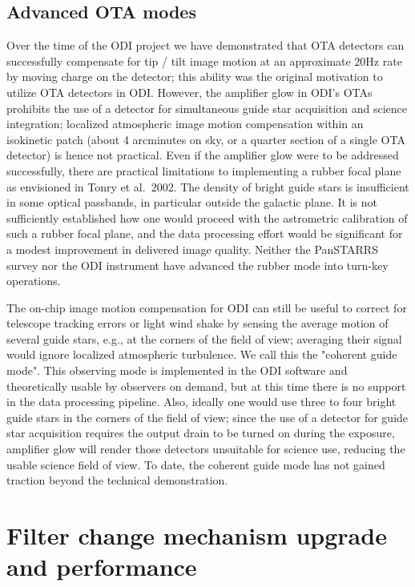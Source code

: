 \documentclass[]{spieman}
\begin{document}
\subsection{Advanced OTA modes}

Over the time of the ODI project we have demonstrated that OTA detectors can
successfully compensate for tip / tilt image motion at an approximate 20Hz rate
by moving charge on the detector; this ability was the original motivation to
utilize OTA detectors in ODI.  However, the amplifier glow in ODI's OTAs
prohibits the use of a detector for simultaneous guide star acquisition and
science integration; localized atmospheric image motion compensation within an
isokinetic patch (about 4 arcminutes on sky, or a quarter section of a single OTA detector) is
hence not practical. Even if the amplifier glow were to be addressed
successfully, there are practical limitations to implementing a rubber focal
plane as envisioned in Tonry et al.~2002\cite{tonry2002}. The density of  bright guide stars is
insufficient in some  optical passbands, in particular outside the galactic
plane. It is not sufficiently established how one would proceed with the
astrometric calibration of such a rubber focal plane, and the data processing
effort would be significant for a modest improvement in delivered image quality.
Neither the PanSTARRS survey nor the ODI instrument have advanced the rubber
mode into turn-key operations.

The on-chip image motion compensation for ODI can still be useful to correct for
telescope tracking errors or light wind shake by sensing the average motion of
several guide stars, e.g., at the corners of the field of view; averaging their
signal would ignore localized atmospheric turbulence. We call this the "coherent
guide mode"\cite{harbeck2014}. This observing mode is implemented in the ODI software and
theoretically usable by observers on demand, but at this time there is no
support in the  data processing pipeline. Also, ideally one would use three to
four bright guide stars in the corners of the field of view; since the use of a
detector for guide star acquisition requires the output drain to be turned on
during the exposure, amplifier glow will render those detectors unsuitable for
science use, reducing the usable science field of view. To date, the
coherent guide mode has not gained traction beyond the technical demonstration.




\section{Filter change mechanism upgrade and performance}
\end{document}
